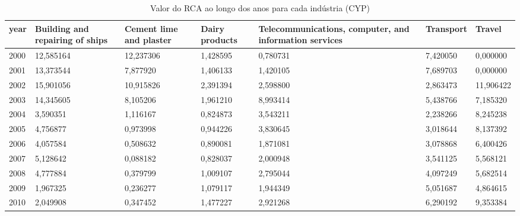 \begin{table}
\centering
\caption{Valor do RCA ao longo dos anos para cada indústria (CYP)}
\begin{tabular}{p{1cm}p{2cm}p{2cm}p{2cm}p{2cm}p{2cm}p{2cm}}
\toprule
 year &  Building and repairing of ships &  Cement lime and plaster &  Dairy products &  Telecommunications, computer, and information services &  Transport &    Travel \\
\midrule
 2000 &                        12,585164 &                12,237306 &        1,428595 &                                           0,780731 &   7,420050 &  0,000000 \\
 2001 &                        13,373544 &                 7,877920 &        1,406133 &                                           1,420105 &   7,689703 &  0,000000 \\
 2002 &                        15,901056 &                10,915826 &        2,391394 &                                           2,598800 &   2,863473 & 11,906422 \\
 2003 &                        14,345605 &                 8,105206 &        1,961210 &                                           8,993414 &   5,438766 &  7,185320 \\
 2004 &                         3,590351 &                 1,116167 &        0,824873 &                                           3,543211 &   2,238266 &  8,245238 \\
 2005 &                         4,756877 &                 0,973998 &        0,944226 &                                           3,830645 &   3,018644 &  8,137392 \\
 2006 &                         4,057584 &                 0,508632 &        0,890081 &                                           1,871081 &   3,078868 &  6,400426 \\
 2007 &                         5,128642 &                 0,088182 &        0,828037 &                                           2,000948 &   3,541125 &  5,568121 \\
 2008 &                         4,777884 &                 0,379799 &        1,009107 &                                           2,795044 &   4,097249 &  5,682514 \\
 2009 &                         1,967325 &                 0,236277 &        1,079117 &                                           1,944349 &   5,051687 &  4,864615 \\
 2010 &                         2,049908 &                 0,347452 &        1,477227 &                                           2,921268 &   6,290192 &  9,353384 \\

\end{tabular}
\end{table}
